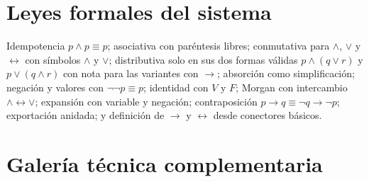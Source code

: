 \documentclass[11pt,a4paper,openany]{book}
\begin{document}
\chapter{Leyes formales del sistema}
\label{ch:leyes-formal}
Idempotencia $p \land p \equiv p$; asociativa con par\'entesis libres; conmutativa para $\land$, $\lor$ y $\leftrightarrow$ con s\'imbolos $\land$ y $\lor$; distributiva solo en sus dos formas v\'alidas $p \land (q \lor r)$ y $p \lor (q \land r)$ con nota para las variantes con $\to$; absorci\'on como simplificaci\'on; negaci\'on y valores con $\lnot\lnot p \equiv p$; identidad con $V$ y $F$; Morgan con intercambio $\land \leftrightarrow \lor$; expansi\'on con variable y negaci\'on; contraposici\'on $p \to q \equiv \lnot q \to \lnot p$; exportaci\'on anidada; y definici\'on de $\to$ y $\leftrightarrow$ desde conectores b\'asicos.

\chapter{Galer\'ia t\'ecnica complementaria}
\label{ch:gal-tec}
\end{document}
